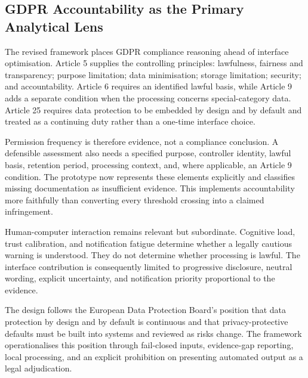 
\subsection{GDPR Accountability as the Primary Analytical Lens}

The revised framework places GDPR compliance reasoning ahead of interface optimisation. Article 5 supplies the controlling principles: lawfulness, fairness and transparency; purpose limitation; data minimisation; storage limitation; security; and accountability. Article 6 requires an identified lawful basis, while Article 9 adds a separate condition when the processing concerns special-category data. Article 25 requires data protection to be embedded by design and by default and treated as a continuing duty rather than a one-time interface choice.

Permission frequency is therefore evidence, not a compliance conclusion. A defensible assessment also needs a specified purpose, controller identity, lawful basis, retention period, processing context, and, where applicable, an Article 9 condition. The prototype now represents these elements explicitly and classifies missing documentation as insufficient evidence. This implements accountability more faithfully than converting every threshold crossing into a claimed infringement.

Human-computer interaction remains relevant but subordinate. Cognitive load, trust calibration, and notification fatigue determine whether a legally cautious warning is understood. They do not determine whether processing is lawful. The interface contribution is consequently limited to progressive disclosure, neutral wording, explicit uncertainty, and notification priority proportional to the evidence.

The design follows the European Data Protection Board's position that data protection by design and by default is continuous and that privacy-protective defaults must be built into systems and reviewed as risks change. The framework operationalises this position through fail-closed inputs, evidence-gap reporting, local processing, and an explicit prohibition on presenting automated output as a legal adjudication.
